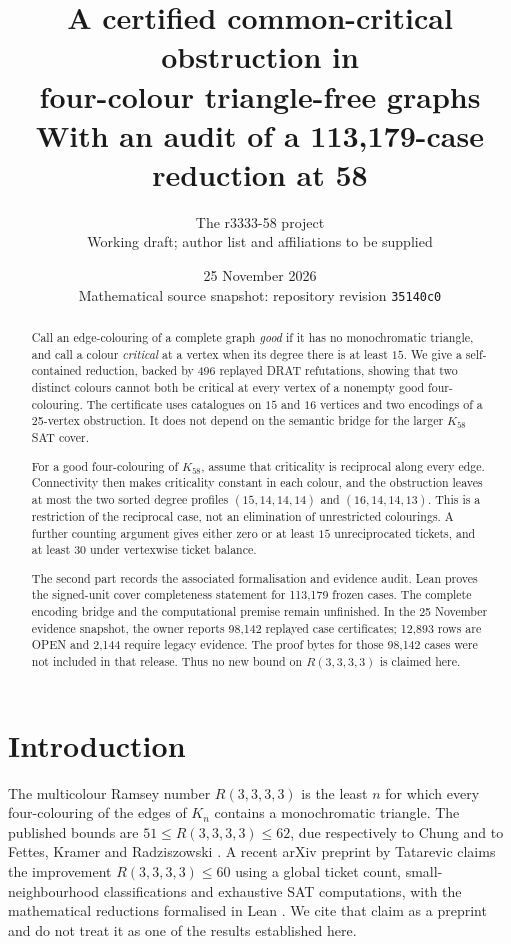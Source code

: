 \documentclass[11pt]{article}
\title{A certified common-critical obstruction in\\
four-colour triangle-free graphs\\
\large With an audit of a 113,179-case reduction at 58}
\author{The r3333-58 project\\[-1pt]
\small Working draft; author list and affiliations to be supplied}
\date{25 November 2026\\[-1pt]
\small Mathematical source snapshot: repository revision \texttt{35140c0}}
\newcommand{\R}{R(3,3,3,3)}
\theoremstyle{definition}
\theoremstyle{remark}
\begin{document}
\maketitle

\begin{abstract}
\noindent
Call an edge-colouring of a complete graph \emph{good} if it has no
monochromatic triangle, and call a colour \emph{critical} at a vertex when its
degree there is at least $15$.  We give a self-contained reduction, backed by
496 replayed DRAT refutations, showing that two distinct colours cannot both
be critical at every vertex of a nonempty good four-colouring.  The certificate
uses catalogues on $15$ and $16$ vertices and two encodings of a
25-vertex obstruction.  It does not depend on the semantic bridge for the
larger $K_{58}$ SAT cover.

For a good four-colouring of $K_{58}$, assume that criticality is reciprocal
along every edge.  Connectivity then makes criticality constant in each colour,
and the obstruction leaves at most the two sorted degree profiles
$(15,14,14,14)$ and $(16,14,14,13)$.  This is a restriction of the reciprocal
case, not an elimination of unrestricted colourings.  A further counting
argument gives either zero or at least $15$ unreciprocated tickets, and at
least $30$ under vertexwise ticket balance.

The second part records the associated formalisation and evidence audit.  Lean
proves the signed-unit cover completeness statement for 113,179 frozen cases.
The complete encoding bridge and the computational premise remain unfinished.
In the 25 November evidence snapshot, the owner reports 98,142 replayed case
certificates; 12,893 rows are OPEN and 2,144 require legacy evidence.  The
proof bytes for those 98,142 cases were not included in that release.  Thus no
new bound on $\R$ is claimed here.
\end{abstract}

\section{Introduction}\label{sec:intro}

The multicolour Ramsey number $\R$ is the least $n$ for which every
four-colouring of the edges of $K_n$ contains a monochromatic triangle.  The
published bounds are $51\leq\R\leq62$, due respectively to Chung and to
Fettes, Kramer and Radziszowski
\cite{Chung1973,FKR2004,Radziszowski2026}.  A recent arXiv preprint by
Tatarevic claims the improvement $\R\leq60$ using a global ticket count,
small-neighbourhood classifications and exhaustive SAT computations, with the
mathematical reductions formalised in Lean \cite{Tatarevic2026}.  We cite that
claim as a preprint and do not treat it as one of the results established here.
\end{document}
